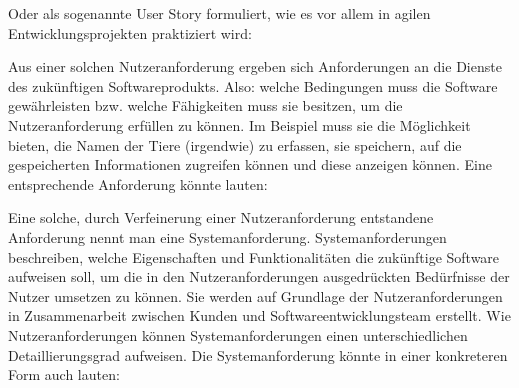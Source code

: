 \vspace{2mm} %


\vspace{\baselineskip} %

Oder als sogenannte User Story formuliert, wie es vor allem in agilen Entwicklungsprojekten praktiziert wird:

\vspace{2mm} %


\pagebreak %


Aus einer solchen Nutzeranforderung ergeben sich Anforderungen an die Dienste des zukünftigen Softwareprodukts. Also: welche Bedingungen muss die Software \mbox{gewährleisten} bzw. welche Fähigkeiten muss sie besitzen, um die Nutzeranforderung erfüllen zu können. Im Beispiel muss sie die Möglichkeit bieten, die Namen der Tiere (irgendwie) zu erfassen, sie speichern, auf die gespeicherten Informationen zugreifen können und diese anzeigen können. Eine entsprechende Anforderung könnte lauten:

\vspace{2mm} %


\vspace{\baselineskip} %

Eine solche, durch Verfeinerung einer Nutzeranforderung entstandene Anforderung nennt man eine Systemanforderung. Systemanforderungen beschreiben, welche
\linebreak %
Eigenschaften und Funktionalitäten die zukünftige Software aufweisen soll, um die in den Nutzeranforderungen ausgedrückten Bedürfnisse der Nutzer umsetzen zu können. Sie werden auf Grundlage der Nutzeranforderungen in Zusammenarbeit zwischen Kunden und Softwareentwicklungsteam erstellt. Wie Nutzeranforderungen können Systemanforderungen einen unterschiedlichen Detaillierungsgrad aufweisen. Die Systemanforderung könnte in einer konkreteren Form auch lauten:

